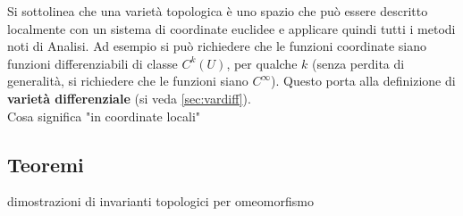 Si sottolinea che una varietà topologica è uno spazio che può essere descritto
localmente con un sistema di coordinate euclidee e applicare quindi tutti i metodi
noti di Analisi.
Ad esempio si può richiedere che le funzioni coordinate siano funzioni differenziabili
di classe $C^{k}(U)$, per qualche $k$ (senza perdita di generalità, si richiedere che le funzioni siano $C^\infty$). Questo porta alla definizione di
\textbf{varietà differenziale} (si veda \ref{sec:vardiff}).\\

Cosa significa "in coordinate locali"

\subsection*{Teoremi}
dimostrazioni di invarianti topologici per omeomorfismo
